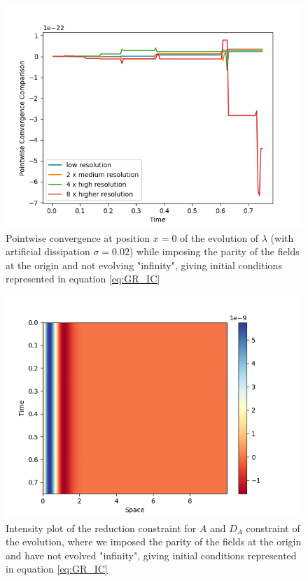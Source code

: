 \begin{figure}[H]
    \centering
    \includegraphics[width=0.9\columnwidth]{Images/lambda-point.png}
    \caption{Pointwise convergence at position $x = 0$ of the evolution of $\lambda$ (with artificial dissipation $\sigma = 0.02$) while imposing the parity of the fields at the origin and not evolving "infinity", giving initial conditions represented in equation \ref{eq:GR_IC}}
    \label{fig:point_lambda}
\end{figure}

\newpage

\begin{figure}[H]
    \centering
    \includegraphics[width=0.9\columnwidth]{Images/adm_evolution-2nd_order-Reduction_A.png}
    \caption{Intensity plot of the reduction constraint for $A$ and $D_A$ constraint of the evolution, where we imposed the parity of the fields at the origin and have not evolved "infinity", giving initial conditions represented in equation \ref{eq:GR_IC}}
    \label{fig:red_A}
\end{figure}

